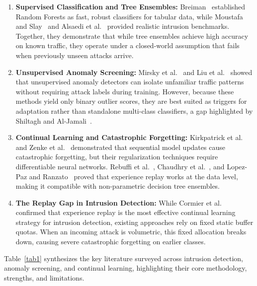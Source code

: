 \begin{enumerate}
    \item \textbf{Supervised Classification and Tree Ensembles:} Breiman~\cite{breiman2001random} established Random Forests as fast, robust classifiers for tabular data, while Moustafa and Slay~\cite{moustafa2015unsw} and Alsaedi et al.~\cite{alshammari2020toniot} provided realistic intrusion benchmarks. Together, they demonstrate that while tree ensembles achieve high accuracy on known traffic, they operate under a closed-world assumption that fails when previously unseen attacks arrive.
    \item \textbf{Unsupervised Anomaly Screening:} Mirsky et al.~\cite{mirsky2018kitsune} and Liu et al.~\cite{liu2008isolation} showed that unsupervised anomaly detectors can isolate unfamiliar traffic patterns without requiring attack labels during training. However, because these methods yield only binary outlier scores, they are best suited as triggers for adaptation rather than standalone multi-class classifiers, a gap highlighted by Shiltagh and Al-Jamali~\cite{shiltagh2025zeroday}.
    \item \textbf{Continual Learning and Catastrophic Forgetting:} Kirkpatrick et al.~\cite{kirkpatrick2017overcoming} and Zenke et al.~\cite{zenke2017continual} demonstrated that sequential model updates cause catastrophic forgetting, but their regularization techniques require differentiable neural networks. Rebuffi et al.~\cite{rebuffi2017icarl}, Chaudhry et al.~\cite{chaudhry2019tiny}, and Lopez-Paz and Ranzato~\cite{lopezpaz2017gem} proved that experience replay works at the data level, making it compatible with non-parametric decision tree ensembles.
    \item \textbf{The Replay Gap in Intrusion Detection:} While Cormier et al.~\cite{replay_or_regret2023} confirmed that experience replay is the most effective continual learning strategy for intrusion detection, existing approaches rely on fixed static buffer quotas. When an incoming attack is volumetric, this fixed allocation breaks down, causing severe catastrophic forgetting on earlier classes.
\end{enumerate}

Table~\ref{tab1} synthesizes the key literature surveyed across intrusion detection, anomaly screening, and continual learning, highlighting their core methodology, strengths, and limitations.

